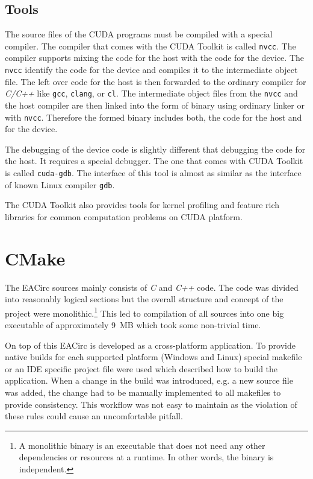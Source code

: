 \documentclass[12pt,oneside]{fithesis2}
\begin{document}
\section{Tools}

The source files of the CUDA programs must be compiled with a special compiler. The compiler that comes with the CUDA Toolkit is called \texttt{nvcc}. The compiler supports mixing the code for the host with the code for the device. The \texttt{nvcc} identify the code for the device and compiles it to the intermediate object file. The left over code for the host is then forwarded to the ordinary compiler for \emph{C/C++} like \texttt{gcc}, \texttt{clang}, or \texttt{cl}. The intermediate object files from the \texttt{nvcc} and the host compiler are then linked into the form of binary using ordinary linker or with \texttt{nvcc}. Therefore the formed binary includes both, the code for the host and for the device.

The debugging of the device code is slightly different that debugging the code for the host. It requires a special debugger. The one that comes with CUDA Toolkit is called \texttt{cuda-gdb}. The interface of this tool is almost as similar as the interface of known Linux compiler \texttt{gdb}.

The CUDA Toolkit also provides tools for kernel profiling and feature rich libraries for common computation problems on CUDA platform.





\chapter{CMake}
The EACirc sources mainly consists of \emph{C} and \emph{C++} code. The code was divided into reasonably logical sections but the overall structure and concept of the project were monolithic.\footnote{A monolithic binary is an executable that does not need any other dependencies or resources at a runtime. In other words, the binary is independent.} This led to compilation of all sources into one big executable of approximately 9~MB which took some non-trivial time.

On top of this EACirc is developed as a cross-platform application. To provide native builds for each supported platform (Windows \cite{win} and Linux) special makefile or an IDE specific project file were used which described how to build the application. When a change in the build was introduced, e.g. a new source file was added, the change had to be manually implemented to all makefiles to provide consistency. This workflow was not easy to maintain as the violation of these rules could cause an uncomfortable pitfall.
\end{document}
